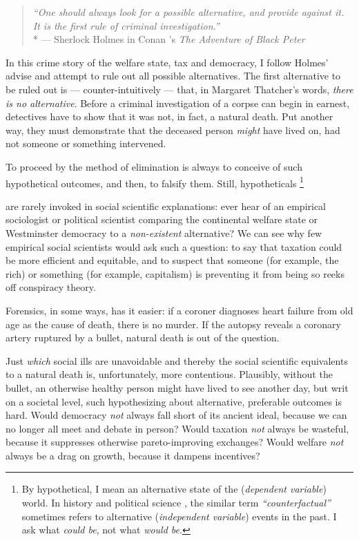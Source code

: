 
\begin{quote}
	\emph{``One should always look for a possible alternative, and provide against it.
	It is the first rule of criminal investigation.''}
	\\*
	--- Sherlock Holmes in Conan \citeauthor{Doyle1904}'s \emph{The Adventure of Black Peter} \citeyearpar[567]{Doyle1904}
\end{quote}

In this crime story of the welfare state, tax and democracy, I follow Holmes' advise and attempt to rule out all possible alternatives.
The first alternative to be ruled out is --- counter-intuitively --- that, in Margaret Thatcher's words, \emph{there is no alternative}.
Before a criminal investigation of a corpse can begin in earnest, detectives have to show that it was not, in fact, a natural death.
Put another way, they must demonstrate that the deceased person \emph{might} have lived on, had not someone or something intervened.

To proceed by the method of elimination is always to conceive of such hypothetical outcomes, and then, to falsify them.
Still, hypotheticals
\footnote{
	By hypothetical, I mean an alternative state of the (\emph{dependent variable}) world.
	In history \citep[recently reviewed by][]{Bunzl2004} and political science \citep[for a methodological appraisal, see][]{Fearon1991}, the similar term \emph{``counterfactual''} sometimes refers to alternative (\emph{independent variable}) events in the past.
	I ask what \emph{could be}, not what \emph{would be}.
}

are rarely invoked in social scientific explanations:
ever hear of an empirical sociologist or political scientist comparing the continental welfare state \citep{Esping-Andersen-1990-aa} or Westminster democracy \citep{Lijphart-1999-aa} to a \emph{non-existent} alternative?
We can see why few empirical social scientists would ask such a question:
to say that taxation could be more efficient and equitable, and to suspect that someone (for example, the rich) or something (for example, capitalism) is preventing it from being so reeks off conspiracy theory.

Forensics, in some ways, has it easier:
if a coroner diagnoses heart failure from old age as the cause of death, there is no murder.
If the autopsy reveals a coronary artery ruptured by a bullet, natural death is out of the question.

Just \emph{which} social ills are unavoidable and thereby the social scientific equivalents to a natural death is, unfortunately, more contentious.
Plausibly, without the bullet, an otherwise healthy person might have lived to see another day, but writ on a societal level, such hypothesizing about alternative, preferable outcomes is hard.
Would democracy \emph{not} always fall short of its ancient ideal, because we can no longer all meet and debate in person?
Would taxation \emph{not} always be wasteful, because it suppresses otherwise pareto-improving exchanges?
Would welfare \emph{not} always be a drag on growth, because it dampens incentives?

